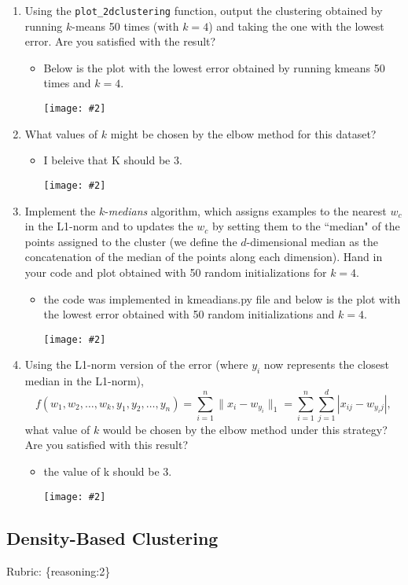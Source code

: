 \documentclass{article}
\def\gre#1{{\color{gre}#1}}
\def\norm#1{\|#1\|}
\newcommand{\centerfig}[2]{\begin{center}\texttt{[image: \#2]}\end{center}}
\def\items#1{\begin{itemize}#1\end{itemize}}
\def\enum#1{\begin{enumerate}#1\end{enumerate}}
\def\rubric#1{\gre{Rubric: \{#1\}}}{}
\begin{document}
{{ {\enum{
 \item Using the \texttt{plot\_2dclustering} function, output the clustering obtained by running $k$-means 50 times (with $k=4$)  and taking the one with the lowest error. Are you satisfied with the result?
\items{
\item Below is the plot with the lowest error obtained by running kmeans 50 times and $k = 4$.  \centerfig{.5}{../figs/kmeans_3_3_1.png}
}
 \item What values of $k$ might be chosen by the elbow method for this dataset?
\items{
\item I beleive that K should be 3. \centerfig{.5}{../figs/q3_3_2errors.pdf}
}
 \item Implement the $k$-\emph{medians} algorithm, which assigns examples to the nearest $w_c$ in the L1-norm and to updates the $w_c$ by setting them to the ``median" of the points assigned to the cluster (we define the $d$-dimensional median as the concatenation of the median of the points along each dimension). Hand in your code and plot obtained with 50 random initializations for $k = 4$.
\items{
\item the code was implemented in kmeadians.py file and below is the plot with the lowest error obtained with 50 random initializations and $k = 4$.
\centerfig{.5}{../figs/kmedians_3_3_3.png}
}
\item Using the L1-norm version of the error (where $y_i$ now represents the closest median in the L1-norm),
\[
f(w_1,w_2,\dots,w_k,y_1,y_2,\dots,y_n) = \sum_{i=1}^n \norm{x_i - w_{y_i}}_1 = \sum_{i=1}^n \sum_{j=1}^d |x_{ij} - w_{y_ij}|,
\]
what value of $k$ would be chosen by the elbow method under this strategy? Are you satisfied with this result?
\items{
\item the value of k should be 3. \centerfig{.5}{../figs/q3_3_4medians_errors.pdf}
}
}


\subsection{Density-Based Clustering}
\rubric{reasoning:2}

}}}
\end{document}
